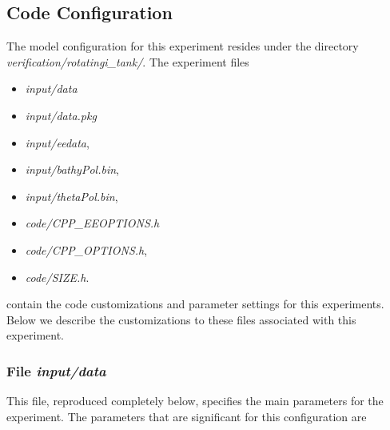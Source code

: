 \subsection{Code Configuration}
\label{www:tutorials}
\label{SEC:eg-baro-code_config}

The model configuration for this experiment resides under the
directory {\it verification/rotatingi\_tank/}.  The experiment files
\begin{itemize}
\item {\it input/data}
\item {\it input/data.pkg}
\item {\it input/eedata},
\item {\it input/bathyPol.bin},
\item {\it input/thetaPol.bin},
\item {\it code/CPP\_EEOPTIONS.h}
\item {\it code/CPP\_OPTIONS.h},
\item {\it code/SIZE.h}.
\end{itemize}

contain the code customizations and parameter settings for this 
experiments. Below we describe the customizations
to these files associated with this experiment.

\subsubsection{File {\it input/data}}
\label{www:tutorials}

This file, reproduced completely below, specifies the main parameters 
for the experiment. The parameters that are significant for this configuration
are

